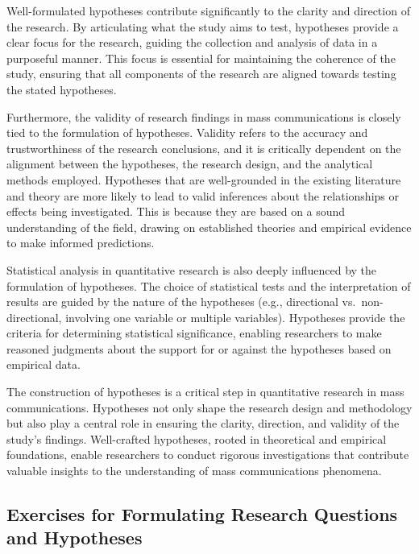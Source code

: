 \documentclass[
]{book}
\begin{document}
Well-formulated hypotheses contribute significantly to the clarity and direction of the research. By articulating what the study aims to test, hypotheses provide a clear focus for the research, guiding the collection and analysis of data in a purposeful manner. This focus is essential for maintaining the coherence of the study, ensuring that all components of the research are aligned towards testing the stated hypotheses.

Furthermore, the validity of research findings in mass communications is closely tied to the formulation of hypotheses. Validity refers to the accuracy and trustworthiness of the research conclusions, and it is critically dependent on the alignment between the hypotheses, the research design, and the analytical methods employed. Hypotheses that are well-grounded in the existing literature and theory are more likely to lead to valid inferences about the relationships or effects being investigated. This is because they are based on a sound understanding of the field, drawing on established theories and empirical evidence to make informed predictions.

Statistical analysis in quantitative research is also deeply influenced by the formulation of hypotheses. The choice of statistical tests and the interpretation of results are guided by the nature of the hypotheses (e.g., directional vs.~non-directional, involving one variable or multiple variables). Hypotheses provide the criteria for determining statistical significance, enabling researchers to make reasoned judgments about the support for or against the hypotheses based on empirical data.

The construction of hypotheses is a critical step in quantitative research in mass communications. Hypotheses not only shape the research design and methodology but also play a central role in ensuring the clarity, direction, and validity of the study's findings. Well-crafted hypotheses, rooted in theoretical and empirical foundations, enable researchers to conduct rigorous investigations that contribute valuable insights to the understanding of mass communications phenomena.

\hypertarget{exercises-for-formulating-research-questions-and-hypotheses}{%
\subsection*{Exercises for Formulating Research Questions and Hypotheses}\label{exercises-for-formulating-research-questions-and-hypotheses}}
\end{document}
